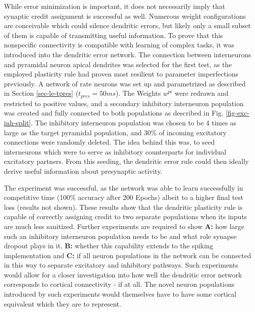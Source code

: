 While error minimization is important, it does not necessarily imply that synaptic credit assignment is successful as
well. Numerous weight configurations are conceivable which could silence dendritic errors, but likely only a small
subset of them is capable of transmitting useful information. To prove that this nonspecific connectivity is compatible
with learning of complex tasks, it was introduced into the dendritic error network. The connection between interneurons
and pyramidal neuron apical dendrites was selected for the first test, as the employed plasticity rule had proven most
resilient to parameter imperfections previously. A network of rate neurons was set up and parametrized as described in
Section \ref{sec-le-tpres} ($t_{pres}= 50ms$). The Weights $w^{pi}$ were redrawn and restricted to positive values, and
a secondary inhibitory interneuron population was created and fully connected to both populations as described in Fig.
\ref{fig-exc-inh-split}. The inhibitory interneuron population was chosen to be 4 times as large as the target pyramidal
population, and $30\%$ of incoming excitatory connections were randomly deleted. The idea behind this was, to seed
interneurons which were to serve as inhibitory counterparts for individual excitatory partners. From this seeding, the
dendritic error rule could then ideally derive useful information about presynaptic activity.

The experiment was successful, as the network was able to learn successfully in competitive time (100\% accuracy after
200 Epochs) albeit to a higher final test loss (results not shown). These results show that the dendritic plasticity
rule is capable of correctly assigning credit to two separate populations when its inputs are much less sanitized.
Further experiments are required to show \textbf{A:} how large such an inhibitory interneuron population needs to be and
what role synapse dropout plays in it, \textbf{B:} whether this capability extends to the spiking implementation and
\textbf{C:} if all neuron populations in the network can be connected in this way to separate excitatory and inhibitory
pathways. Such experiments would allow for a closer investigation into how well the dendritic error network corresponds
to cortical connectivity - if at all. The novel neuron populations introduced by such experiments would themselves have
to have some cortical equivalent which they are to represent.



